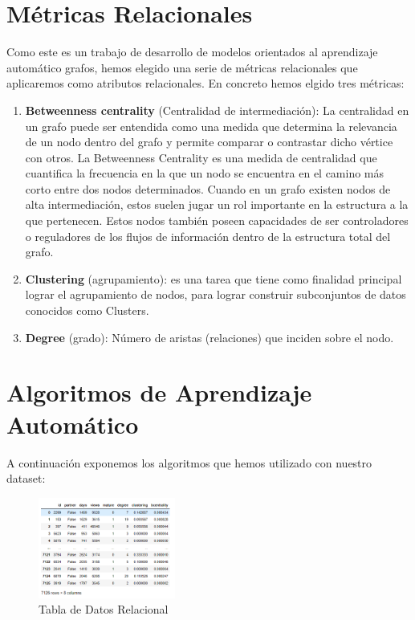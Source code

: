 \documentclass[conference,a4paper]{IEEEtran}
\begin{document}
\section{Métricas Relacionales}
Como este es un trabajo de desarrollo de modelos orientados al aprendizaje automático grafos, hemos elegido una serie de métricas relacionales que aplicaremos como atributos relacionales. En concreto hemos elgido tres métricas:

\begin{enumerate}
\item\textbf{Betweenness centrality} (Centralidad de intermediación): La centralidad en un grafo puede ser entendida como una medida que determina la relevancia de un nodo dentro del grafo y permite comparar o contrastar dicho vértice con otros. La Betweenness Centrality es una medida de centralidad que cuantifica la frecuencia en la que un nodo se encuentra en el camino más corto entre dos nodos determinados. Cuando en un grafo existen nodos de alta intermediación, estos suelen jugar un rol importante en la estructura a la que pertenecen. Estos nodos también poseen capacidades de ser controladores o reguladores de los flujos de información dentro de la estructura total del grafo. 
\item\textbf{Clustering} (agrupamiento): es una tarea que tiene como finalidad principal lograr el agrupamiento de nodos, para lograr construir subconjuntos de datos conocidos como Clusters.
\item\textbf{Degree} (grado): Número de aristas (relaciones) que inciden sobre el nodo.
\end{enumerate}


 
\section{Algoritmos de Aprendizaje Automático}
A continuación exponemos los algoritmos que hemos utilizado con nuestro dataset:

\begin{figure} %
    \centering
    \includegraphics[width=0.4\textwidth]{./ImagenesMemoria/TablaRelacional}
    \caption{\label{fig:datasetRelacional}Tabla de Datos Relacional}
\end{figure}
\end{document}
